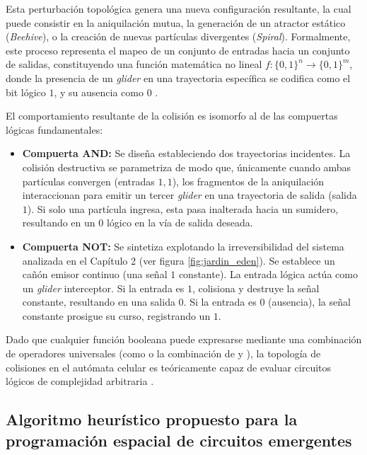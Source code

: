 Esta perturbación topológica genera una nueva configuración resultante, la cual puede consistir en la aniquilación mutua, la generación de un atractor estático (\textit{Beehive}), o la creación de nuevas partículas divergentes (\textit{Spiral}). Formalmente, este proceso representa el mapeo de un conjunto de entradas hacia un conjunto de salidas, constituyendo una función matemática no lineal $f: \{0,1\}^n \to \{0,1\}^m$, donde la presencia de un \textit{glider} en una trayectoria específica se codifica como el bit lógico $1$, y su ausencia como $0$ \cite{Basurto2009}.

El comportamiento resultante de la colisión es isomorfo al de las compuertas lógicas fundamentales:

\begin{itemize}
    \item \textbf{Compuerta AND:} Se diseña estableciendo dos trayectorias incidentes. La colisión destructiva se parametriza de modo que, únicamente cuando ambas partículas convergen (entradas $1, 1$), los fragmentos de la aniquilación interaccionan para emitir un tercer \textit{glider} en una trayectoria de salida (salida $1$). Si solo una partícula ingresa, esta pasa inalterada hacia un sumidero, resultando en un $0$ lógico en la vía de salida deseada.
    \item \textbf{Compuerta NOT:} Se sintetiza explotando la irreversibilidad del sistema analizada en el Capítulo 2 (ver figura \ref{fig:jardin_eden}).
    Se establece un cañón emisor continuo (una señal $1$ constante). La entrada lógica actúa como un \textit{glider} interceptor. Si la entrada es $1$, colisiona y destruye la señal constante, resultando en una salida $0$. Si la entrada es $0$ (ausencia), la señal constante prosigue su curso, registrando un $1$.
\end{itemize}

Dado que cualquier función booleana puede expresarse mediante una combinación de operadores universales (como  o la combinación de  y ), la topología de colisiones en el autómata celular es teóricamente capaz de evaluar circuitos lógicos de complejidad arbitraria \cite{Wolfram2002}.

\subsection{Algoritmo heurístico propuesto para la programación espacial de circuitos emergentes}
\label{subsec:algoritmo_heuristico_programacion}

